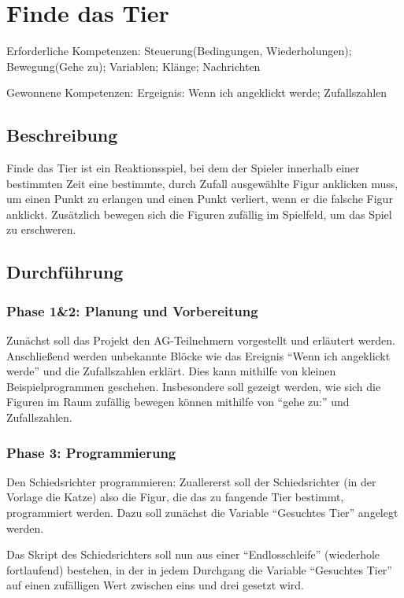 \section{Finde das Tier}

Erforderliche Kompetenzen: Steuerung(Bedingungen, Wiederholungen);
Bewegung(Gehe zu); Variablen; Klänge; Nachrichten

Gewonnene Kompetenzen: Ergeignis: Wenn ich angeklickt werde;
Zufallszahlen

\subsection{Beschreibung}

Finde das Tier ist ein Reaktionsspiel, bei dem der Spieler innerhalb
einer bestimmten Zeit eine bestimmte, durch Zufall ausgewählte Figur
anklicken muss, um einen Punkt zu erlangen und einen Punkt verliert,
wenn er die falsche Figur anklickt. Zusätzlich bewegen sich die Figuren
zufällig im Spielfeld, um das Spiel zu erschweren.

\subsection{Durchführung}\label{durchfuxfchrung}

\subsubsection{Phase 1\&2: Planung und Vorbereitung}

Zunächst soll das Projekt den AG-Teilnehmern vorgestellt und erläutert
werden. Anschließend werden unbekannte Blöcke wie das Ereignis ``Wenn
ich angeklickt werde'' und die Zufallszahlen erklärt. Dies kann mithilfe
von kleinen Beispielprogrammen geschehen. Insbesondere soll gezeigt
werden, wie sich die Figuren im Raum zufällig bewegen können mithilfe
von ``gehe zu:'' und Zufallszahlen.

\subsubsection{Phase 3: Programmierung}

Den Schiedsrichter programmieren: Zuallererst soll der Schiedsrichter
(in der Vorlage die Katze) also die Figur, die das zu fangende Tier
bestimmt, programmiert werden. Dazu soll zunächst die Variable
``Gesuchtes Tier'' angelegt werden.

Das Skript des Schiedsrichters soll nun aus einer ``Endlosschleife''
(wiederhole fortlaufend) bestehen, in der in jedem Durchgang die
Variable ``Gesuchtes Tier'' auf einen zufälligen Wert zwischen eins und
drei gesetzt wird.

